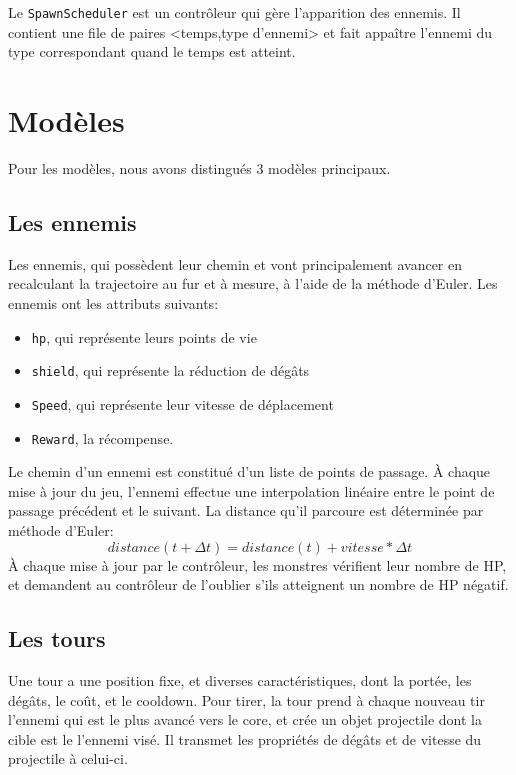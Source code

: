 \documentclass[a4paper,11pt]{article}
\begin{document}
\noindent Le \texttt{SpawnScheduler} est un contr\^oleur qui g\`ere
l'apparition des ennemis. Il contient une file de paires
<temps,type d'ennemi> et fait appa\^itre l'ennemi du type correspondant quand
le temps est atteint.


\section{Modèles} \label{models}

Pour les modèles, nous avons distingués 3 modèles principaux.

\subsection{Les ennemis}
Les ennemis, qui possèdent leur chemin et vont principalement avancer en
recalculant la trajectoire au fur et à mesure, à l'aide de la méthode d'Euler.
Les ennemis ont les attributs suivants:
\begin{itemize}
    \item \texttt{hp}, qui représente leurs points de vie
    \item \texttt{shield}, qui représente la réduction de dégâts
    \item \texttt{Speed}, qui représente leur vitesse de déplacement
    \item \texttt{Reward}, la récompense.
\end{itemize}

Le chemin d'un ennemi est constitu\'e d'un liste de points de passage.
\`A chaque mise \`a jour du jeu, l'ennemi effectue une interpolation lin\'eaire
entre le point de passage pr\'ec\'edent et le suivant. La distance qu'il
parcoure est d\'etermin\'ee par m\'ethode d'Euler:
$$ distance(t+\Delta t) = distance(t) + vitesse * \Delta t $$
À chaque mise à jour par le contrôleur, les monstres vérifient leur nombre de HP,
et demandent au contrôleur de l'oublier s'ils atteignent un nombre de HP négatif.

\subsection{Les tours}

Une tour a une position fixe, et diverses caractéristiques, dont la portée, les
dégâts, le coût, et le cooldown. Pour tirer, la tour prend à chaque nouveau tir
l'ennemi qui est le plus avancé vers le core, et crée un objet projectile dont
la cible est le l'ennemi visé. Il transmet les propriétés de dégâts et de vitesse
du projectile à celui-ci.
\end{document}
